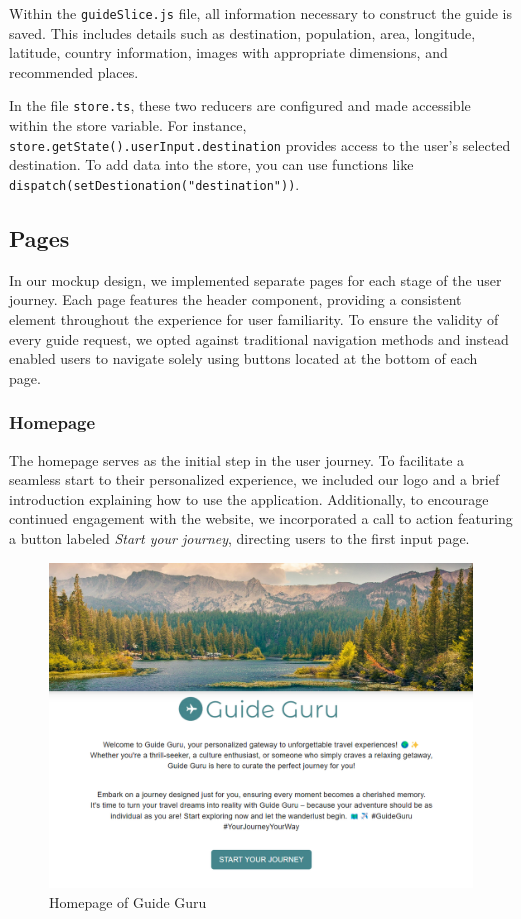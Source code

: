\documentclass[english,notitlepage,smartquotes]{hgbreport}
\begin{document}
Within the \texttt{guideSlice.js} file, all information necessary to construct the guide is saved. This includes details such as destination, population, area, longitude, latitude, country information, images with appropriate dimensions, and recommended places.

In the file \texttt{store.ts}, these two reducers are configured and made accessible within the store variable. For instance, \texttt{store.getState().userInput.destination} provides access to the user's selected destination. To add data into the store, you can use functions like  \texttt{dispatch(setDestionation("destination"))}.

\subsection{Pages}

In our mockup design, we implemented separate pages for each stage of the user journey. Each page features the header component, providing a consistent element throughout the experience for user familiarity. To ensure the validity of every guide request, we opted against traditional navigation methods and instead enabled users to navigate solely using buttons located at the bottom of each page.

\subsubsection{Homepage}

The homepage serves as the initial step in the user journey. To facilitate a seamless start to their personalized experience, we included our logo and a brief introduction explaining how to use the application. Additionally, to encourage continued engagement with the website, we incorporated a call to action featuring a button labeled \textit{Start your journey}, directing users to the first input page.

\begin{figure}[H]
	\centering
	\includegraphics[width=1\textwidth]{Homepage.png}
	\caption{Homepage of Guide Guru}
\end{figure}
\end{document}
